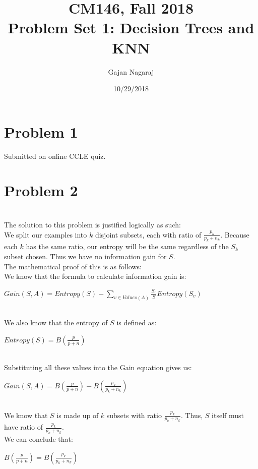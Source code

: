 \documentclass[11pt]{article}
\newcommand{\solution}[1]{{{\color{blue}{\bf Solution:} {#1}}}}
\begin{document}
\title{CM146, Fall 2018 \\ Problem Set 1: Decision Trees and KNN}
\author{Gajan Nagaraj}
\date{10/29/2018}
\maketitle
\vspace{-0.75in}

\section{Problem 1}
Submitted on online CCLE quiz.

\newpage
\section{Problem 2}

\solution{}\\
The solution to this problem is justified logically as such: \\
We split our examples into $k$ disjoint subsets, each with ratio of $\frac{p_{k}}{p_{k}+n_{k}}$. Because each $k$ has the same ratio, our entropy will be the same regardless of the $S_{k}$ subset chosen. Thus we have no information gain for $S$. \\
The mathematical proof of this is as follows: \\
We know that the formula to calculate information gain is: \\
\centerline{$Gain(S,A) = Entropy(S) - \sum_{v \in Values(A)} \frac{S_{v}}{S} Entropy(S_{v})$} \\
We also know that the entropy of $S$ is defined as: \\
\centerline{$Entropy(S) = B(\frac{p}{p+n})$} \\
Substituting all these values into the Gain equation gives us: \\
\centerline{$Gain(S,A) = B(\frac{p}{p+n}) - B(\frac{p_{k}}{p_{k}+n_{k}})$} \\
We know that $S$ is made up of $k$ subsets with ratio $\frac{p_{k}}{p_{k}+n_{k}}$. Thus, $S$ itself must have ratio of $\frac{p_{k}}{p_{k}+n_{k}}$. \\
We can conclude that: \\
\centerline{$B(\frac{p}{p+n}) = B(\frac{p_{k}}{p_{k}+n_{k}})$} \\

\newpage
\end{document}
